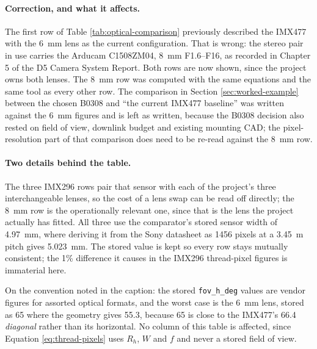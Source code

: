 \paragraph{Correction, and what it affects.} The first row of Table \ref{tab:optical-comparison} previously described the IMX477 with the 6~mm lens as the current configuration. That is wrong: the stereo pair in use carries the Arducam C1508ZM04, 8~mm F1.6--F16, as recorded in Chapter 5 of the D5 Camera System Report. Both rows are now shown, since the project owns both lenses. The 8~mm row was computed with the same equations and the same tool as every other row. The comparison in Section \ref{sec:worked-example} between the chosen B0308 and ``the current IMX477 baseline'' was written against the 6~mm figures and is left as written, because the B0308 decision also rested on field of view, downlink budget and existing mounting CAD; the pixel-resolution part of that comparison does need to be re-read against the 8~mm row.


\paragraph{Two details behind the table.} The three IMX296 rows pair that sensor with each of the project's three interchangeable lenses, so the cost of a lens swap can be read off directly; the 8~mm row is the operationally relevant one, since that is the lens the project actually has fitted. All three use the comparator's stored sensor width of 4.97~mm, where deriving it from the Sony datasheet as 1456 pixels at a 3.45~\textmu m pitch gives 5.023~mm. The stored value is kept so every row stays mutually consistent; the 1\% difference it causes in the IMX296 thread-pixel figures is immaterial here.

On the convention noted in the caption: the stored \texttt{fov\_h\_deg} values are vendor figures for assorted optical formats, and the worst case is the 6~mm lens, stored as 65\textdegree{} where the geometry gives 55.3\textdegree, because 65\textdegree{} is close to the IMX477's 66.4\textdegree{} \emph{diagonal} rather than its horizontal. No column of this table is affected, since Equation \ref{eq:thread-pixels} uses $R_h$, $W$ and $f$ and never a stored field of view.

